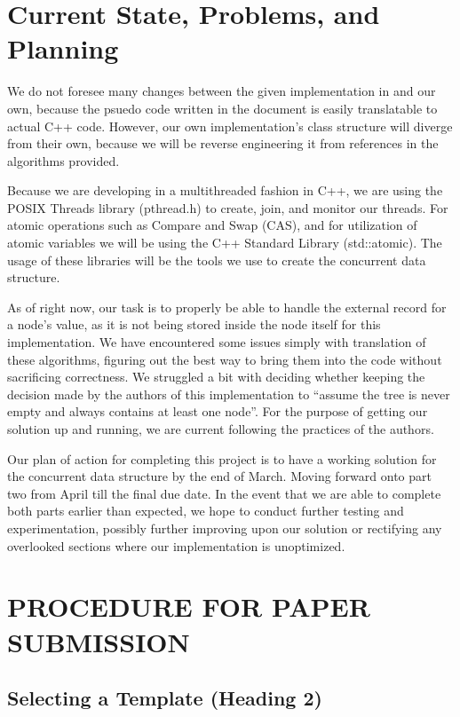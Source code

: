 \documentclass[letterpaper, 10 pt, conference]{ieeeconf}  %
\begin{document}
	\section{Current State, Problems, and Planning}
	We do not foresee many changes between the given implementation in \cite{RedBlackDoc} and our own, because the psuedo code written in the document is easily translatable to actual C++ code. However, our own implementation's class structure will diverge from their own, because we will be reverse engineering it from references in the algorithms provided.
	\par Because we are developing in a multithreaded fashion in C++, we are using the POSIX Threads library (pthread.h) to create, join, and monitor our threads. For atomic operations such as Compare and Swap (CAS), and for utilization of atomic variables we will be using the C++ Standard Library (std::atomic). The usage of these libraries will be the tools we use to create the concurrent data structure.
	\par As of right now, our task is to properly be able to handle the external record for a node's value, as it is not being stored inside the node itself for this implementation. We have encountered some issues simply with translation of these algorithms, figuring out the best way to bring them into the code without sacrificing correctness. We struggled a bit with deciding whether keeping the decision made by the authors of this implementation to ``assume the tree is never empty and always contains at least one node''\cite{RedBlackDoc}. For the purpose of getting our solution up and running, we are current following the practices of the authors.
	\par Our plan of action for completing this project is to have a working solution for the concurrent data structure by the end of March. Moving forward onto part two from April till the final due date. In the event that we are able to complete both parts earlier than expected, we hope to conduct further testing and experimentation, possibly further improving upon our solution or rectifying any overlooked sections where our implementation is unoptimized.
	\section{PROCEDURE FOR PAPER SUBMISSION}
	
	\subsection{Selecting a Template (Heading 2)}
	
\end{document}

